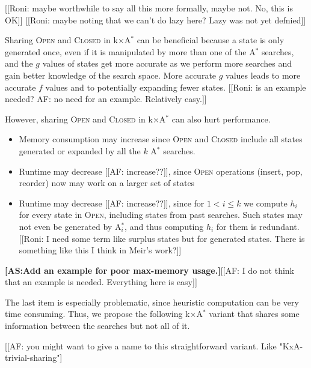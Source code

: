 \documentclass[twoside,11pt]{article}
\newcommand{\astar}{A$^*$\xspace}
\newcommand{\kxastar}{k$\times$A$^*$\xspace}
\newcommand{\astari}[1]{A$^*_{#1}$\xspace}
\newcommand{\open}{\textsc{Open}\xspace}
\newcommand{\closed}{\textsc{Closed}\xspace}
\newcommand{\abda}[1]{\textbf{[AS:#1]}}
\begin{document}
[[Roni: maybe worthwhile to say all this more formally, maybe not. No, this is OK]]
[[Roni: maybe noting that we can't do lazy here? Lazy was not yet defnied]]

Sharing \open and \closed in \kxastar can be beneficial because a state is only generated once, even if it is manipulated by more than one of the \astar searches, and the $g$ values of states get more accurate as we perform more searches and gain better knowledge of the search space.
More accurate $g$ values leads to more accurate $f$ values and to potentially expanding fewer states. [[Roni: is an example needed? AF: no need for an example. Relatively easy.]]

However, sharing \open and \closed in \kxastar can also hurt performance.
\begin{itemize}
\item Memory consumption may increase since \open and \closed include all states generated or expanded by all the $k$ \astar searches.
\item Runtime may decrease [[AF: increase??]], since \open operations (insert, pop, reorder) now may work on a larger set of states
\item Runtime may decrease  [[AF: increase??]], since for $1<i\leq k$ we compute $h_i$ for every state in \open, including states from past searches.
Such states may not even be generated by \astari{i}, and thus computing $h_i$ for them is redundant.
[[Roni: I need some term like surplus states but for generated states. There is something like this I think in Meir's work?]]
\end{itemize}

\abda{Add an example for poor max-memory usage.}[[AF: I do not think that an example is needed. Everything here is easy]]

The last item is especially problematic, since heuristic computation can be very time consuming.
Thus, we propose the following \kxastar variant that shares some information between the searches but not all of it.

[[AF: you might want to give a name to this straightforward variant. Like "KxA-trivial-sharing"]


\end{document}

